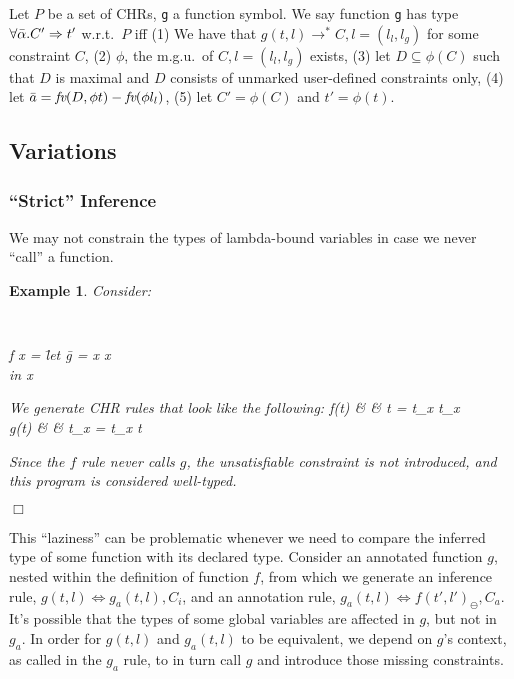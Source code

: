 \documentclass{article}
\newcommand{\arrow}[0]{\rightarrow}
\newcommand{\simparrow}[0]{\Longleftrightarrow}
\newcommand{\rightarrowtail}{\longrightarrow}
\newtheorem{ex}{Example}
\newenvironment{example}{
        \begin{ex}\rm}%
        {\hfill$\Box$\end{ex}}
\newenvironment{ttprog}{\begin{trivlist} %
            \item \tt
        \begin{tabbing}}{\end{tabbing}\end{trivlist}}
\begin{document}
\begin{definition}
Let $P$ be a set of CHRs, {\tt g} a function symbol.
We say function {\tt g} has type $\forall\bar{\alpha}.C'\Rightarrow t'$ w.r.t.~$P$ iff
(1) We have that $g(t, l) \rightarrowtail^* C,l=(l_l,l_g)$ for some constraint $C$,
(2) $\phi$, the m.g.u.~of $C,l=(l_l,l_g)$ exists,  
(3) let $D\subseteq \phi(C)$ such that
$D$ is maximal and $D$ consists of unmarked user-defined constraints only,
(4) let $\bar{a} = \mbox{\it fv}(D, \phi t) - \mbox{\it fv}(\phi l_l)$,
(5) let $C'=\phi(C)$ and $t'=\phi(t)$.
\end{definition}

\subsection{Variations}

\subsubsection{``Strict'' Inference}
\label{sec:strict}

We may not constrain the types of lambda-bound variables in case we never ``call'' a function.

\begin{example}
Consider:

\begin{ttprog}
f x = \= let \=g = x x \\
      \> in  \>x
\end{ttprog}

We generate CHR rules that look like the following:
f(t) & \simparrow & t = t_x \arrow t_x \\
g(t) & \simparrow & t_x = t_x \arrow t
\eda

Since the $f$ rule never calls $g$, the unsatisfiable constraint is not
introduced, and this program is considered well-typed.

\end{example}

This ``laziness'' can be problematic whenever we need to compare the inferred 
type of some function with its declared type.
Consider an annotated function $g$, nested within the definition of function
$f$, from which we generate an inference rule, 
$g(t,l) \simparrow g_a(t,l), C_i$, and an annotation rule, 
$g_a(t,l) \simparrow f(t',l')_{\ominus}, C_a$. 
It's possible that the types of some global variables are affected in $g$, but
not in $g_a$. 
In order for $g(t,l)$ and $g_a(t,l)$ to be equivalent, we depend on $g$'s
context, as called in the $g_a$ rule, to in turn call $g$ and introduce those
missing constraints.
\end{document}
